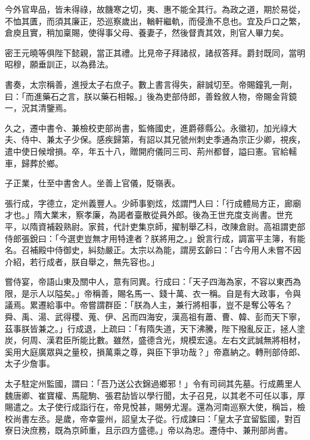 \begin{pinyinscope}
 今外官卑品，皆未得祿，故饑寒之切，夷、惠不能全其行。為政之道，期於易從，不恤其匱，而須其廉正，恐巡察歲出，輶軒繼軌，而侵漁不息也。宜及戶口之繁，倉庾且實，稍加稟賜，使得事父母、養妻子，然後督責其效，則官人畢力矣。



 密王元曉等俱陛下懿親，當正其禮。比見帝子拜諸叔，諸叔答拜。爵封既同，當明昭穆，願垂訓正，以為彞法。



 書奏，太宗稱善，進授太子右庶子。數上書言得失，辭誠切至。帝賜鐘乳一劑，曰：「而進藥石之言，朕以藥石相報。」後為吏部侍郎，善銓敘人物，帝賜金背鏡一，況其清鑒焉。



 久之，遷中書令、兼檢校吏部尚書，監脩國史，進爵蓚縣公。永徽初，加光祿大夫、侍中、兼太子少保。感疾歸第，有詔以其兄虢州刺史季通為宗正少卿，視疾，遣中使日候增損。卒，年五十八，贈開府儀同三司、荊州都督，謚曰憲。官給轜車，歸葬於鄉。



 子正業，仕至中書舍人。坐善上官儀，貶嶺表。



 張行成，字德立，定州義豐人。少師事劉炫，炫謂門人曰：「行成體局方正，廊廟才也。」隋大業末，察孝廉，為謁者臺散從員外郎。後為王世充度支尚書。世充平，以隋資補穀熟尉。家貧，代計吏集京師，擢制舉乙科，改陳倉尉。高祖謂吏部侍郎張銳曰：「今選吏豈無才用特達者？朕將用之。」銳言行成，調富平主簿，有能名。召補殿中侍御史，糾劾嚴正。太宗以為能，謂房玄齡曰：「古今用人未嘗不因介紹，若行成者，朕自舉之，無先容也。」



 嘗侍宴，帝語山東及關中人，意有同異。行成曰：「天子四海為家，不容以東西為限，是示人以隘矣。」帝稱善，賜名馬一、錢十萬、衣一稱。自是有大政事，令與議焉。累遷給事中。帝嘗謂群臣：「朕為人主，兼行將相事，豈不是奪公等名？舜、禹、湯、武得稷、蒐、伊、呂而四海安，漢高祖有蕭、曹、韓、彭而天下寧，茲事朕皆兼之。」行成退，上疏曰：「有隋失道，天下沸騰，陛下撥亂反正，拯人塗炭，何周、漢君臣所能比數。雖然，盛德含光，規模宏遠。左右文武誠無將相材，奚用大庭廣眾與之量校，損萬乘之尊，與臣下爭功哉？」帝嘉納之。轉刑部侍郎、太子少詹事。



 太子駐定州監國，謂曰：「吾乃送公衣錦過鄉邪！」令有司祠其先墓。行成薦里人魏唐卿、崔寶權、馬龍駒、張君劼皆以學行聞，太子召見，以其老不可任以事，厚賜遣之。太子使行成詣行在，帝見悅甚，賜勞尤渥。還為河南巡察大使，稱旨，檢校尚書左丞。是歲，帝幸靈州，詔皇太子從。行成諫曰：「皇太子宜留監國，對百寮日決庶務，既為京師重，且示四方盛德。」帝以為忠。遷侍中、兼刑部尚書。




\end{pinyinscope}
